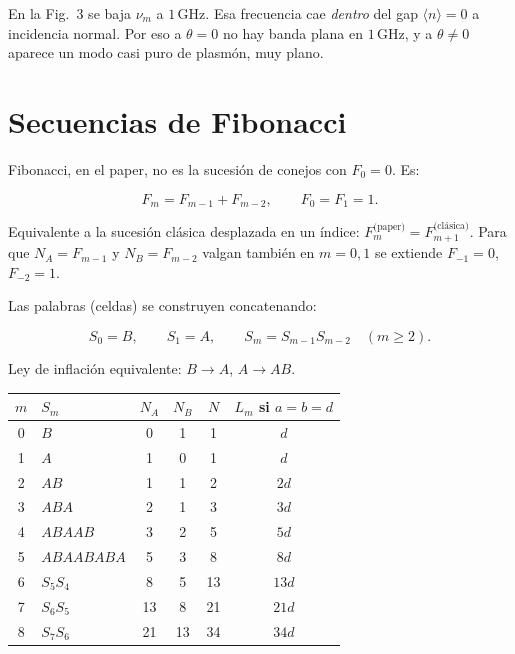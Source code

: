 \documentclass[11pt,a4paper]{article}
\begin{document}
En la Fig.\ 3 se baja \(\nu_m\) a \(1\,\mathrm{GHz}\). Esa frecuencia cae
\emph{dentro} del gap \(\langle n\rangle=0\) a incidencia normal.
Por eso a \(\theta=0\) no hay banda plana en \(1\,\mathrm{GHz}\), y a
\(\theta\neq 0\) aparece un modo casi puro de plasmón, muy plano.

\section{Secuencias de Fibonacci}
\label{sec:fib}

Fibonacci, en el paper, no es la sucesión de conejos con \(F_0=0\).
Es:

\begin{equation}
F_m=F_{m-1}+F_{m-2},\qquad F_0=F_1=1.
\end{equation}

Equivalente a la sucesión clásica desplazada en un índice:
\(F_m^{\text{(paper)}}=F_{m+1}^{\text{(clásica)}}\).
Para que \(N_A=F_{m-1}\) y \(N_B=F_{m-2}\) valgan también en \(m=0,1\) se
extiende \(F_{-1}=0\), \(F_{-2}=1\).

Las palabras (celdas) se construyen concatenando:

\begin{equation}
S_0=B,\qquad S_1=A,\qquad S_m=S_{m-1}S_{m-2}\quad(m\ge 2).
\end{equation}

Ley de inflación equivalente: \(B\to A\), \(A\to AB\).

\begin{center}
\begin{tabular}{clcccc}
\toprule
\(m\) & \(S_m\) & \(N_A\) & \(N_B\) & \(N\) & \(L_m\) si \(a=b=d\) \\
\midrule
0 & \(B\) & 0 & 1 & 1 & \(d\) \\
1 & \(A\) & 1 & 0 & 1 & \(d\) \\
2 & \(AB\) & 1 & 1 & 2 & \(2d\) \\
3 & \(ABA\) & 2 & 1 & 3 & \(3d\) \\
4 & \(ABAAB\) & 3 & 2 & 5 & \(5d\) \\
5 & \(ABAABABA\) & 5 & 3 & 8 & \(8d\) \\
6 & \(S_5S_4\) & 8 & 5 & 13 & \(13d\) \\
7 & \(S_6S_5\) & 13 & 8 & 21 & \(21d\) \\
8 & \(S_7S_6\) & 21 & 13 & 34 & \(34d\) \\
\bottomrule
\end{tabular}
\end{center}
\end{document}
